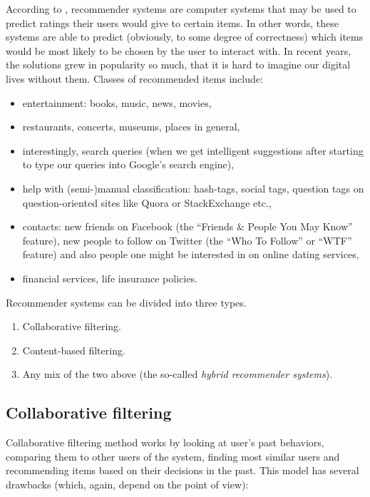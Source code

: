 According to \cite{Ricci:recommenders}, recommender systems are computer systems that may be used to predict ratings their users would give to certain items. In other words, these systems are able to predict (obviously, to some degree of correctness) which items would be most likely to be chosen by the user to interact with. In recent years, the solutions grew in popularity so much, that it is hard to imagine our digital lives without them. Classes of recommended items include:

\begin{itemize}
	\item entertainment: books, music, news, movies,
	\item restaurants, concerts, museums, places in general,
	\item interestingly, search queries (when we get intelligent suggestions after starting to type our queries into Google's search engine),
	\item help with (semi-)manual classification: hash-tags, social tags, question tags on question-oriented sites like Quora or StackExchange etc.,
	\item contacts: new friends on Facebook (the ``Friends \& People You May Know'' feature), new people to follow on Twitter (the ``Who To Follow'' or ``WTF'' feature) and also people one might be interested in on online dating services,
	\item financial services, life insurance policies. \cite{Felfernig:recommenders}
\end{itemize}

Recommender systems can be divided into three types.

\begin{enumerate}
	\item Collaborative filtering.
	\item Content-based filtering.
	\item Any mix of the two above (the so-called \emph{hybrid recommender systems}).
\end{enumerate}

\subsection{Collaborative filtering}

Collaborative filtering method works by looking at user's past behaviors, comparing them to other users of the system, finding most similar users and recommending items based on their decisions in the past. This model has several drawbacks (which, again, depend on the point of view):

